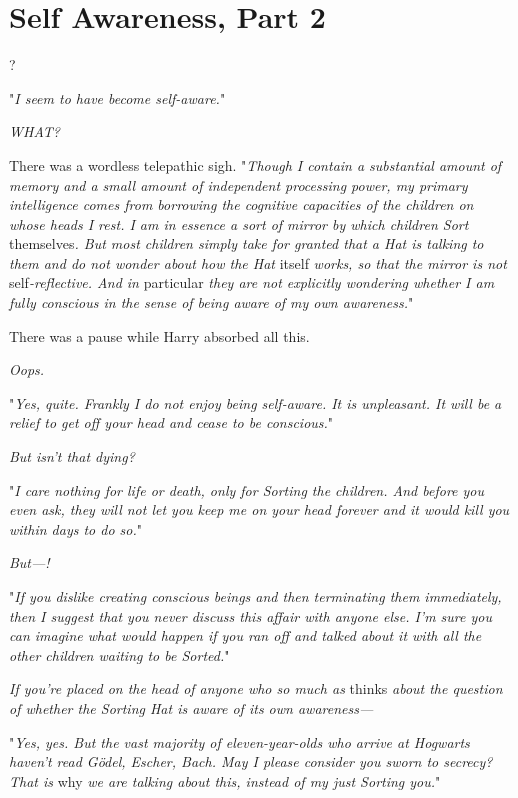 \chapter{Self Awareness, Part 2}

?

"\emph{I seem to have become self-aware.}"

\emph{WHAT?}

There was a wordless telepathic sigh. "\emph{Though I contain a substantial
amount of memory and a small amount of independent processing power, my primary
intelligence comes from borrowing the cognitive capacities of the children on
whose heads I rest. I am in essence a sort of mirror by which children Sort}
themselves\emph{. But most children simply take for granted that a Hat is
talking to them and do not wonder about how the Hat} itself \emph{works, so
that the mirror is not} self\emph{-reflective. And in} particular \emph{they
are not explicitly wondering whether I am fully conscious in the sense of being
aware of my own awareness.}"

There was a pause while Harry absorbed all this.

\emph{Oops.}

"\emph{Yes, quite. Frankly I do not enjoy being self-aware. It is unpleasant.
It will be a relief to get off your head and cease to be conscious.}"

\emph{But{\el} isn't that dying?}

"\emph{I care nothing for life or death, only for Sorting the children. And
before you even ask, they will not let you keep me on your head forever and it
would kill you within days to do so.}"

\emph{But---!}

"\emph{If you dislike creating conscious beings and then terminating them
immediately, then I suggest that you never discuss this affair with anyone
else. I'm sure you can imagine what would happen if you ran off and talked
about it with all the other children waiting to be Sorted.}"

\emph{If you're placed on the head of anyone who so much as} thinks \emph{about
the question of whether the Sorting Hat is aware of its own awareness---}

"\emph{Yes, yes. But the vast majority of eleven-year-olds who arrive at
Hogwarts haven't read \emph{Gödel, Escher, Bach}. May I please consider you sworn to
secrecy? That is} why \emph{we are talking about this, instead of my just
Sorting you.}"


